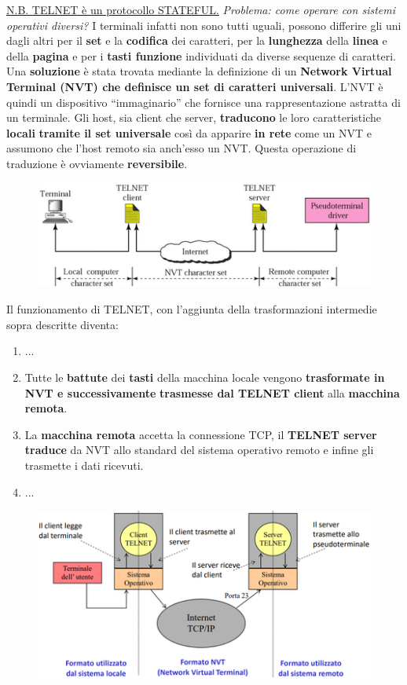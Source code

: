 \documentclass[11pt,a4paper]{article}
\theoremstyle{definition}
\begin{document}
\underline{N.B. TELNET è un protocollo STATEFUL.}
\newpage
\textit{Problema: come operare con sistemi operativi diversi?}\newline\newline
I terminali infatti non sono tutti uguali, possono differire gli uni dagli altri per il \textbf{set} e la \textbf{codifica} dei caratteri, per la \textbf{lunghezza} della \textbf{linea} e della \textbf{pagina} e per i \textbf{tasti funzione} individuati da diverse sequenze di caratteri. \newline\newline
Una \textbf{soluzione} è stata trovata mediante la definizione di un \textbf{Network Virtual  Terminal (NVT) che definisce un \textbf{set di caratteri universali}}.
L’NVT è quindi un dispositivo “immaginario” che fornisce una
rappresentazione astratta di un terminale. Gli host, sia client
che server, \textbf{traducono} le loro caratteristiche \textbf{locali} \textbf{tramite il set universale} così da apparire \textbf{in rete} come un NVT e assumono che l’host remoto sia anch'esso un NVT. Questa operazione di traduzione è ovviamente \textbf{reversibile}.
\begin{figure}[!h]
	\includegraphics[scale=0.6]{Immagini/NVT.png}
	\centering
\end{figure}
\newline
Il funzionamento di TELNET, con l'aggiunta della trasformazioni intermedie sopra descritte diventa:
\begin{enumerate}
	\item ...
	\item  Tutte le \textbf{battute} dei \textbf{tasti} della macchina locale vengono \textbf{trasformate in NVT e successivamente} \textbf{trasmesse dal TELNET client}
	      alla \textbf{macchina remota}.
	\item La \textbf{macchina remota} accetta la connessione TCP, il \textbf{TELNET server} \textbf{traduce} da NVT allo standard del sistema operativo remoto e infine gli trasmette i dati ricevuti.
	\item ...
\end{enumerate}
\begin{figure}[!h]
	\includegraphics[scale=0.5]{Immagini/NVT2.png}
	\centering
\end{figure}
\end{document}
